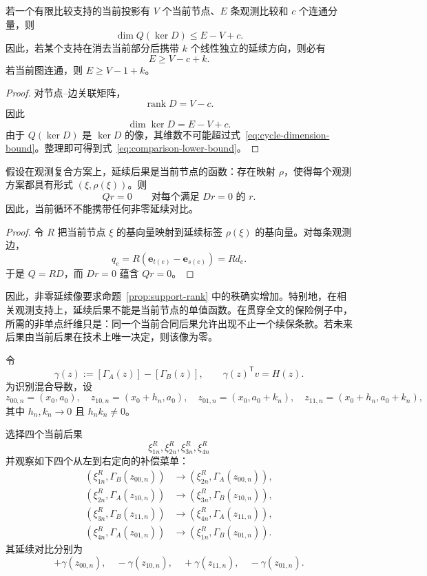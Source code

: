 \begin{corollary}[比较数量的下界]
\label{cor:comparison-lower-bound}
若一个有限比较支持的当前投影有 $V$ 个当前节点、$E$ 条观测比较和 $c$ 个连通分量，则
\begin{equation}
\boxed{
\dim Q(\ker D)\le E-V+c.}
\label{eq:cycle-dimension-bound}
\end{equation}
因此，若某个支持在消去当前部分后携带 $k$ 个线性独立的延续方向，则必有
\begin{equation}
\boxed{
E\ge V-c+k.}
\label{eq:comparison-lower-bound}
\end{equation}
若当前图连通，则 $E\ge V-1+k$。
\end{corollary}

\begin{proof}
对节点--边关联矩阵，
\[
\operatorname{rank}D=V-c.
\]
因此
\[
\dim\ker D=E-V+c.
\]
由于 $Q(\ker D)$ 是 $\ker D$ 的像，其维数不可能超过式~\eqref{eq:cycle-dimension-bound}。整理即可得到式~\eqref{eq:comparison-lower-bound}。
\end{proof}

\begin{corollary}[单值延续支持]
\label{prop:single-valued-support}
假设在观测复合方案上，延续后果是当前节点的函数：存在映射 $\rho$，使得每个观测方案都具有形式 $(\xi,\rho(\xi))$。则
\[
Qr=0
\qquad
\text{对每个满足 }Dr=0\text{ 的 }r.
\]
因此，当前循环不能携带任何非零延续对比。
\end{corollary}

\begin{proof}
令 $R$ 把当前节点 $\xi$ 的基向量映射到延续标签 $\rho(\xi)$ 的基向量。对每条观测边，
\[
q_e=R(\mathbf e_{t(e)}-\mathbf e_{s(e)})=Rd_e.
\]
于是 $Q=RD$，而 $Dr=0$ 蕴含 $Qr=0$。
\end{proof}

因此，非零延续像要求命题~\ref{prop:support-rank} 中的秩确实增加。特别地，在相关观测支持上，延续后果不能是当前节点的单值函数。在贯穿全文的保险例子中，所需的非单点纤维只是：同一个当前合同后果允许出现不止一个续保条款。若未来后果由当前后果在技术上唯一决定，则该像为零。

令
\[
\gamma(z):=[\Gamma_A(z)]-[\Gamma_B(z)],
\qquad
\gamma(z)^{\mathsf T}v=H(z).
\]
为识别混合导数，设
\[
z_{00,n}=(x_0,a_0),\quad
z_{10,n}=(x_0+h_n,a_0),\quad
z_{01,n}=(x_0,a_0+k_n),\quad
z_{11,n}=(x_0+h_n,a_0+k_n),
\]
其中 $h_n,k_n\to0$ 且 $h_nk_n\ne0$。

选择四个当前后果
\[
\xi^R_{1n},\xi^R_{2n},\xi^R_{3n},\xi^R_{4n}
\]
并观察如下四个从左到右定向的补偿菜单：
\begin{align}
(\xi^R_{1n},\Gamma_B(z_{00,n}))
&\longrightarrow
(\xi^R_{2n},\Gamma_A(z_{00,n})),
\label{eq:primitive-rect-1}\\
(\xi^R_{2n},\Gamma_A(z_{10,n}))
&\longrightarrow
(\xi^R_{3n},\Gamma_B(z_{10,n})),
\label{eq:primitive-rect-2}\\
(\xi^R_{3n},\Gamma_B(z_{11,n}))
&\longrightarrow
(\xi^R_{4n},\Gamma_A(z_{11,n})),
\label{eq:primitive-rect-3}\\
(\xi^R_{4n},\Gamma_A(z_{01,n}))
&\longrightarrow
(\xi^R_{1n},\Gamma_B(z_{01,n})).
\label{eq:primitive-rect-4}
\end{align}
其延续对比分别为
\[
+\gamma(z_{00,n}),\quad
-\gamma(z_{10,n}),\quad
+\gamma(z_{11,n}),\quad
-\gamma(z_{01,n}).
\]

